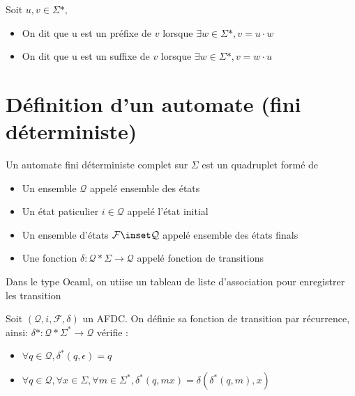\begin{defi}
    Soit $u,v \in \Sigma*,$\\
    \begin{itemize}
        \item On dit que u est un préfixe de $v$ lorsque $\exists w \in \Sigma*, v=u\cdot w$
        \item On dit que u est un suffixe de $v$ lorsque $\exists w \in \Sigma*, v=w\cdot u$
    \end{itemize}
\end{defi}

\section{Définition d'un automate (fini déterministe)}

\begin{defi}
    Un automate fini déterministe complet sur $\Sigma$ est un quadruplet formé de
    \begin{itemize}
        \item Un ensemble $\mathcal{Q}$ appelé ensemble des états
        \item Un état paticulier $i \in \mathcal{Q}$ appelé l'état initial
        \item Un ensemble d'états $\mathcal{F} \inset \mathcal{Q}$ appelé ensemble des états finals
        \item Une fonction $\delta : \mathcal{Q}*\Sigma \rightarrow \mathcal{Q}$ appelé fonction de transitions
    \end{itemize}
\end{defi}

\begin{rmq}
    Dans le type Ocaml, on utiise un tableau de liste d'association pour enregistrer les transition
\end{rmq}

\begin{defi}
    Soit $(\mathcal{Q},i,\mathcal{F},\delta)$ un AFDC. On définie sa fonction de transition par récurrence, ainsi:
    $\delta* : \mathcal{Q}*\Sigma^* \rightarrow \mathcal{Q}$ vérifie : \\
    \begin{itemize}
        \item $\forall q \in \mathcal{Q}, \delta^*(q,\epsilon)=q$
        \item $\forall q \in \mathcal{Q}, \forall x \in \Sigma, \forall m \in \Sigma^*,\delta^*(q,mx)=\delta(\delta^*(q,m),x)$
    \end{itemize}
\end{defi}

